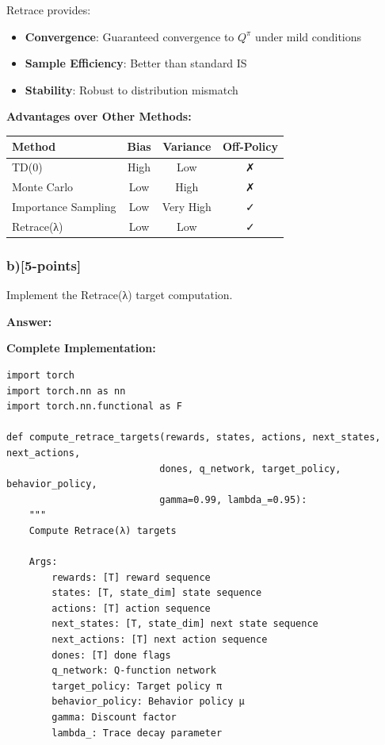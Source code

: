 \documentclass[12pt]{article}
\begin{document}
{{Retrace provides:
\begin{itemize}
\item \textbf{Convergence}: Guaranteed convergence to $Q^\pi$ under mild conditions
\item \textbf{Sample Efficiency}: Better than standard IS
\item \textbf{Stability}: Robust to distribution mismatch
\end{itemize}

\textbf{Advantages over Other Methods:}

\begin{center}
\begin{tabular}{|l|c|c|c|}
\hline
\textbf{Method} & \textbf{Bias} & \textbf{Variance} & \textbf{Off-Policy} \\
\hline
TD(0) & High & Low & ✗ \\
Monte Carlo & Low & High & ✗ \\
Importance Sampling & Low & Very High & ✓ \\
Retrace(λ) & Low & Low & ✓ \\
\hline
\end{tabular}
\end{center}

\subsubsection{b)[5-points]} Implement the Retrace(λ) target computation.

\textbf{Answer:}

\textbf{Complete Implementation:}

\begin{verbatim}
import torch
import torch.nn as nn
import torch.nn.functional as F

def compute_retrace_targets(rewards, states, actions, next_states, next_actions,
                           dones, q_network, target_policy, behavior_policy,
                           gamma=0.99, lambda_=0.95):
    """
    Compute Retrace(λ) targets
    
    Args:
        rewards: [T] reward sequence
        states: [T, state_dim] state sequence
        actions: [T] action sequence
        next_states: [T, state_dim] next state sequence
        next_actions: [T] next action sequence
        dones: [T] done flags
        q_network: Q-function network
        target_policy: Target policy π
        behavior_policy: Behavior policy μ
        gamma: Discount factor
        lambda_: Trace decay parameter
    

\end{verbatim}}}
\end{document}

